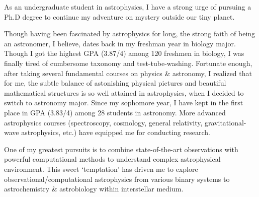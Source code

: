 \documentclass[11pt, a4paper]{awesome-cv} %
\begin{document}
\makecvheader %



\begin{cvletter}


As an undergraduate student in astrophysics, I have a strong urge of pursuing a Ph.D degree to continue my adventure on mystery outside our tiny planet. 

Though having been fascinated by astrophysics for long, the strong faith of being an astronomer, I believe, dates back in my freshman year in biology major. Though I got the highest GPA (3.87/4) among 120 freshmen in biology, I was finally tired of cumbersome taxonomy and test-tube-washing. Fortunate enough, after taking several fundamental courses on physics \& astronomy, I realized that for me, the subtle balance of astonishing physical pictures and beautiful mathematical structures is so well attained in astrophysics, when I decided to switch to astronomy major. Since my sophomore year, I have kept in the first place in GPA (3.83/4) among 28 students in astronomy. More advanced astrophysics courses (spectroscopy, cosmology, general relativity, gravitational-wave astrophysics, etc.) have equipped me for conducting research.

One of my greatest pursuits is to combine state-of-the-art observations with powerful computational methods to understand complex astrophysical environment. This sweet `temptation' has driven me to explore observational/computational astrophysics from various binary systems to astrochemistry \& astrobiology within interstellar medium.



\end{cvletter}
\end{document}
